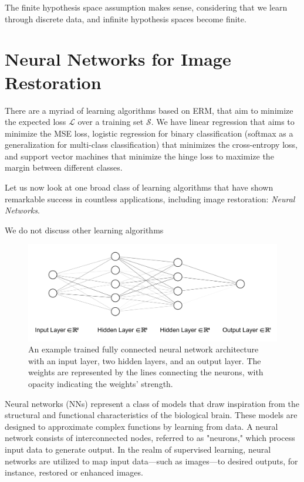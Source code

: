 The finite hypothesis space assumption makes sense, considering that we learn through discrete data, and infinite hypothesis spaces become finite. 

\section{Neural Networks for Image Restoration}
There are a myriad of learning algorithms based on \gls{ERM}, that aim to minimize the expected loss $\mathcal{L}$ over a training set $\mathcal{S}$.  We have linear regression that aims to minimize the \gls{MSE} loss, logistic regression for binary classification (softmax as a generalization for multi-class classification) that minimizes the cross-entropy loss, and support vector machines that minimize the hinge loss to maximize the margin between different classes.

Let us now look at one broad class of learning algorithms that have shown remarkable success in countless applications, including image restoration: \textit{Neural Networks}.

We do not discuss other learning algorithms

\begin{figure}[h]
    \centering
    \includegraphics[width=1\linewidth]{images/simple_nn_architecture.pdf}
    \caption{An example trained fully connected neural network architecture with an input layer, two hidden layers, and an output layer. The weights are represented by the lines connecting the neurons, with opacity indicating the weights' strength.}
    \label{fig:simple-nn-architecture}
\end{figure}
Neural networks (NNs) represent a class of models that draw inspiration from the structural and functional characteristics of the biological brain. These models are designed to approximate complex functions by learning from data. A neural network consists of interconnected nodes, referred to as "neurons," which process input data to generate output. In the realm of supervised learning, neural networks are utilized to map input data—such as images—to desired outputs, for instance, restored or enhanced images.

